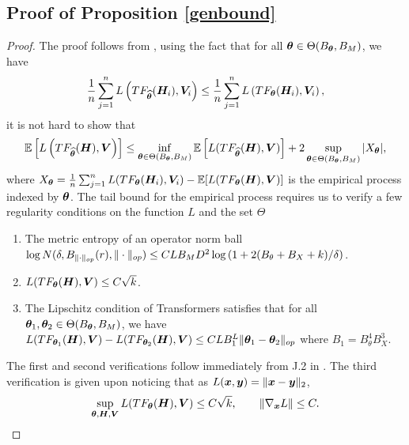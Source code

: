 \subsection{Proof of Proposition \ref{genbound}}
\begin{proof}
    The proof follows from \citep{wainwright2019high}, using the fact that for all $\boldsymbol{\theta}\in \Theta(B_{\boldsymbol{\theta}},B_M)$, we have 
    \begin{align*}
        \frac{1}{n}\sum_{j=1}^nL\left(TF_{\widehat{\boldsymbol{\theta}}}(\boldsymbol{H}_i),\boldsymbol{V}_i\right)\leq\frac{1}{n}\sum_{j=1}^n L\left(TF_{\boldsymbol{\theta}}(\boldsymbol{H}_i),\boldsymbol{V}_i\right),
    \end{align*} 
    it is not hard to show that
    \begin{align*}
        \mathbb{E}\left[L\left(TF_{\widehat{\boldsymbol{\theta}}}(\boldsymbol{H}),\boldsymbol{V}\right)\right]\leq \inf_{\boldsymbol{\theta}\in \Theta(B_{\boldsymbol{\theta}},B_M)}\mathbb{E}\left[L(TF_{\widehat{\boldsymbol{\theta}}}(\boldsymbol{H}),\boldsymbol{V})\right]+2\sup_{\boldsymbol{\theta}\in \Theta(B_{\boldsymbol{\theta}},B_M)}| X_{\boldsymbol{\theta}}|,
    \end{align*}
    where $ X_{\boldsymbol{\theta}}=\frac{1}{n}\sum_{j=1}^nL(TF_{\boldsymbol{\theta}}(\boldsymbol{H}_i),\boldsymbol{V}_i)-\mathbb{E}[L(TF_{\boldsymbol{\theta}}(\boldsymbol{H}),\boldsymbol{V})]$ is the empirical process indexed by $\boldsymbol{\theta}$.
    The tail bound for the empirical process requires us to verify a few regularity conditions \citep{gine2016mathematical} on the function $L$ and the set $\Theta$
    \begin{enumerate}
        \item The metric entropy of an operator norm ball $\log N(\delta, B_{\Vert\cdot\Vert_{op}}(r),\Vert\cdot\Vert_{op})\leq CLB_M D^2\log\left(1+2(B_{\theta}+B_X+k)/\delta\right)$.
        \item $L(TF_{\boldsymbol{\theta}}(\boldsymbol{H}),\boldsymbol{V})\leq C\sqrt k$.
        \item The Lipschitz condition of Transformers satisfies that for all $\boldsymbol{\theta}_1,\boldsymbol{\theta}_2\in\Theta(B_{\boldsymbol{\theta}}, B_{M})$, we have $L(TF_{\boldsymbol{\theta}_1}(\boldsymbol{H}),\boldsymbol{V}) - L(TF_{\boldsymbol{\theta}_2}(\boldsymbol{H}),\boldsymbol{V})\leq C L B_1^{L}\Vert\boldsymbol{\theta}_1-\boldsymbol{\theta}_2\Vert_{op}$ where $B_1=B_{\theta}^4B_X^3$.
    \end{enumerate}
    The first and second verifications follow immediately from J.2 in \citep{bai2024transformers}. The third verification is given upon noticing that as $L(\boldsymbol{x},\boldsymbol{y})=\Vert\boldsymbol{x}-\boldsymbol{y}\Vert_2$,
    \begin{align*}
        \sup_{\boldsymbol{\theta},\boldsymbol{H},\boldsymbol{V}}L(TF_{\boldsymbol{\theta}}(\boldsymbol{H}),\boldsymbol{V})\leq C\sqrt k,\qquad \Vert\nabla_{\boldsymbol{x}} L\Vert\leq C.
    \end{align*}

\end{proof}
